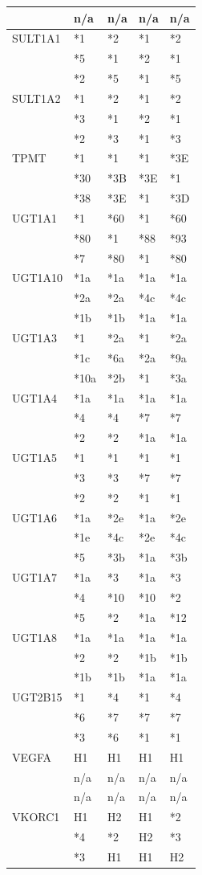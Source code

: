 \documentclass{report}
\begin{document}
\begin{tabularx}{\textwidth}{ X|XXXX }
& n/a & n/a & n/a & n/a \\
\midrule
 SULT1A1
& *1 & *2 & *1 & *2 \\
& *5 & *1 & *2 & *1  \\
& *2 & *5 & *1 & *5 \\
\midrule
 SULT1A2
& *1 & *2 & *1 & *2 \\
& *3 & *1 & *2 & *1  \\
& *2 & *3 & *1 & *3 \\
\midrule
 TPMT
& *1 & *1 & *1 & *3E \\
& *30 & *3B & *3E & *1  \\
& *38 & *3E & *1 & *3D \\
\midrule
 UGT1A1
& *1 & *60 & *1 & *60 \\
& *80 & *1 & *88 & *93  \\
& *7 & *80 & *1 & *80 \\
\midrule
 UGT1A10
& *1a & *1a & *1a & *1a \\
& *2a & *2a & *4c & *4c  \\
& *1b & *1b & *1a & *1a \\
\midrule
 UGT1A3
& *1 & *2a & *1 & *2a \\
& *1c & *6a & *2a & *9a  \\
& *10a & *2b & *1 & *3a \\
\midrule
 UGT1A4
& *1a & *1a & *1a & *1a \\
& *4 & *4 & *7 & *7  \\
& *2 & *2 & *1a & *1a \\
\midrule
 UGT1A5
& *1 & *1 & *1 & *1 \\
& *3 & *3 & *7 & *7  \\
& *2 & *2 & *1 & *1 \\
\midrule
 UGT1A6
& *1a & *2e & *1a & *2e \\
& *1e & *4c & *2e & *4c  \\
& *5 & *3b & *1a & *3b \\
\midrule
 UGT1A7
& *1a & *3 & *1a & *3 \\
& *4 & *10 & *10 & *2  \\
& *5 & *2 & *1a & *12 \\
\midrule
 UGT1A8
& *1a & *1a & *1a & *1a \\
& *2 & *2 & *1b & *1b  \\
& *1b & *1b & *1a & *1a \\
\midrule
 UGT2B15
& *1 & *4 & *1 & *4 \\
& *6 & *7 & *7 & *7  \\
& *3 & *6 & *1 & *1 \\
\midrule
 VEGFA
& H1 & H1 & H1 & H1 \\
& n/a & n/a & n/a & n/a  \\
& n/a & n/a & n/a & n/a \\
\midrule
 VKORC1
& H1 & H2 & H1 & *2 \\
& *4 & *2 & H2 & *3  \\
& *3 & H1 & H1 & H2 \\
\bottomrule
\end{tabularx}
\end{document}
